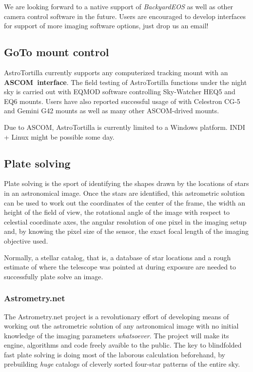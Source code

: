\documentclass[english]{article}
\begin{document}
We are looking forward to a native support of \emph{BackyardEOS} as well as other camera control software in the future. Users are encouraged to develop interfaces for support of more imaging software options, just drop us an email!

\subsection{GoTo mount control}

AstroTortilla currently supports any computerized tracking mount with an
\hbox{\textbf{{ASCOM interface}}}.  The field testing of AstroTortilla
functions under the night sky is carried out with EQMOD software controlling
Sky-Watcher HEQ5 and EQ6 mounts. Users have also reported successful usage of with Celestron CG-5 and Gemini G42 mounts as well as many other ASCOM-drived mounts.

Due to ASCOM, AstroTortilla is currently limited to a Windows platform. INDI + Linux might be possible some day.


\subsection{Plate solving}

Plate solving is the sport of identifying the shapes drawn by the locations of
stars in an astronomical image. Once the stars are identified, this astrometric
solution can be used to work out the coordinates of the center of the frame,
the width an height of the field of view, the rotational angle of the image
with respect to celestial coordinate axes, the angular resolution of one pixel
in the imaging setup and, by knowing the pixel size of the sensor, the exact
focal length of the imaging objective used.

Normally, a stellar catalog, that is, a database of star locations and a rough
estimate of where the telescope was pointed at during exposure are needed to
successfully plate solve an image.

\subsubsection{Astrometry.net}

The Astrometry.net project is a revolutionary effort of developing means of
working out the astrometric solution of any astronomical image with no initial
knowledge of the imaging parameters \emph{whatsoever}. The project will make
its engine, algorithms and code freely avaible to the public. The key to
blindfolded fast plate solving is doing most of the laborous calculation beforehand, 
by prebuilding \emph{huge} catalogs of cleverly sorted four-star patterns of the entire sky.
\end{document}
